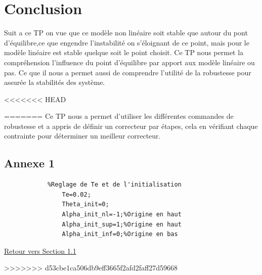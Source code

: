 \documentclass[12pt, a4paper, openany]{report}
\begin{document}
      
\chapter*{Conclusion}
      Suit a ce TP on vue que ce modèle non linéaire soit stable que autour du pont d'équilibre,ce que engendre l'instabilité on s’éloignant de ce point, mais pour le modèle linéaire est stable quelque soit le point choisit.
      Ce TP nous permet la compréhension l’influence du point d’équilibre par apport aux modèle linéaire ou pas.
      Ce que il nous a permet aussi de comprendre l'utilité de la robustesse pour assurée la stabilités des système.   




<<<<<<< HEAD







 


=======
Ce TP nous a permet d'utiliser les différentes commandes de robustesse et a appris de définir un correcteur par étapes, cela en vérifiant chaque contrainte pour déterminer un meilleur correcteur.\\



\begin{appendices}
\chapter*{Annexe 1}
		\begin{lstlisting}
			%Reglage de Te et de l'initialisation
    			Te=0.02;
    			Theta_init=0;
    			Alpha_init_nl=-1;%Origine en haut
    			Alpha_init_sup=1;%Origine en haut
    			Alpha_init_inf=0;%Origine en bas
		\end{lstlisting}
		\hyperref[annexe1]{Retour vers Section 1.1}\label{section1.1}
\end{appendices}
>>>>>>> d53cbe1ca506db9eff3665f2afd2faff27d59668





%
%
\end{document}
